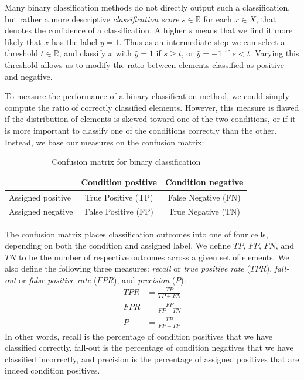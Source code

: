 \documentclass[thesis.tex]{subfiles}
\newcommand\TPR{\mathit{TPR}}
\newcommand\FPR{\mathit{FPR}}
\newcommand\Prec{\mathit{P}}
\newcommand\TP{\mathit{TP}}
\newcommand\FP{\mathit{FP}}
\newcommand\TN{\mathit{TN}}
\newcommand\FN{\mathit{FN}}
\begin{document}
Many binary classification methods do not directly output such a classification, but rather a more descriptive \emph{classification score} $s \in \mathbb{R}$ for each $x \in X$, that denotes the confidence of a classification. A higher $s$ means that we find it more likely that $x$ has the label $y = 1$. Thus as an intermediate step we can select a threshold $t \in \mathbb{R}$, and classify $x$ with $\hat{y} = 1$ if $s \geq t$, or $\hat{y} = -1$ if $s < t$. Varying this threshold allows us to modify the ratio between elements classified as positive and negative.

To measure the performance of a binary classification method, we could simply compute the ratio of correctly classified elements. However, this measure is flawed if the distribution of elements is skewed toward one of the two conditions, or if it is more important to classify one of the conditions correctly than the other. Instead, we base our measures on the confusion matrix:
%
\begin{table}[H]
	\centering
	\bgroup
	\def\arraystretch{1.5}
	\begin{tabular}{|l|c|c|}
		\cline{2-3}
		\multicolumn{1}{c|}{} & Condition positive & Condition negative \\ \hline
		Assigned positive & \cellcolor{green!25}True Positive (TP) & \cellcolor{red!25}False Negative (FN)  \\ \hline
		Assigned negative & \cellcolor{red!25}False Positive (FP) & \cellcolor{green!25}True Negative (TN) \\ \hline
	\end{tabular}
	\egroup
	\caption{Confusion matrix for binary classification}
	\label{tbl:confusion_matrix}
\end{table}
%
The confusion matrix places classification outcomes into one of four cells, depending on both the condition and assigned label. We define $\TP$, $\FP$, $\FN$, and $\TN$ to be the number of respective outcomes across a given set of elements. We also define the following three measures: \emph{recall} or \emph{true positive rate} ($\TPR$), \emph{fall-out} or \emph{false positive rate} ($\FPR$), and \emph{precision} ($\Prec$):
%
\begin{align*}
	\TPR &= \frac{\TP}{\TP + \FN} \\
	\FPR &= \frac{\FP}{\FP + \TN} \\
	\Prec &= \frac{\TP}{\FP + \TP}
\end{align*}
%
In other words, recall is the percentage of condition positives that we have classified correctly, fall-out is the percentage of condition negatives that we have classified incorrectly, and precision is the percentage of assigned positives that are indeed condition positives.
\end{document}
